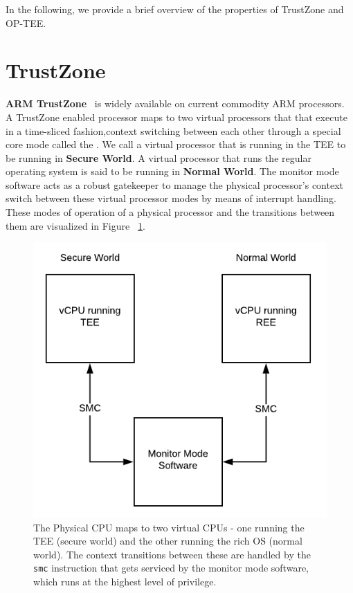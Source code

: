 In the following, we provide a brief overview of the properties of TrustZone and OP-TEE. 

\section{TrustZone}

\textbf{ARM TrustZone}~\cite{trustzone} %
is widely available on current commodity ARM processors. A TrustZone enabled processor maps to two virtual processors that that execute in a time-sliced fashion,context switching between each other through a special core mode called the . We call a virtual processor that is running in the TEE to be running in \textbf{Secure World}. A virtual processor that runs the regular operating system is said to be running in \textbf{Normal World}. The monitor mode software acts as a robust gatekeeper to manage the physical processor's context switch between these virtual processor modes by means of interrupt handling. These modes of operation of a physical processor and the transitions between them are visualized in Figure ~\ref{fig:SMC_transition}.

\begin{figure}[h]
\centering
\includegraphics{fig/SMC_SW_NW.pdf}
  \caption{The Physical CPU maps to two virtual CPUs - one running the TEE (secure world) and the other running the rich OS (normal world). The context transitions between these are handled by the \texttt{smc} instruction that gets serviced by the monitor mode software, which runs at the highest level of privilege. }
    \label{fig:SMC_transition}
\end{figure}

